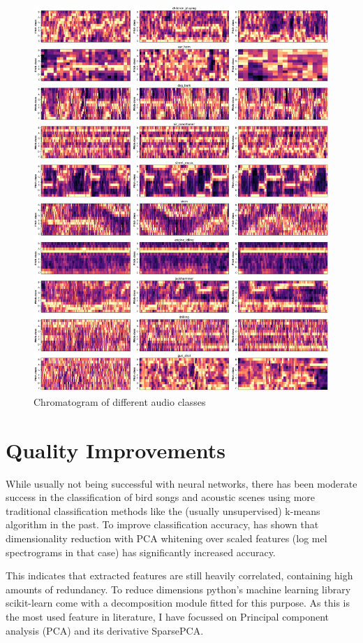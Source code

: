 \begin{figure}[H]
    \centering
	\includegraphics[width=.7\textwidth]{./images/features/chroma}
    \caption{Chromatogram of different audio classes}
    \label{fig:chroma}
\end{figure}



\section{Quality Improvements}
While usually not being successful with neural networks, there has been moderate success in the classification of bird songs and acoustic scenes using more traditional classification methods like the (usually unsupervised) k-means algorithm in the past. To improve classification accuracy, \cite{Coates2012} has shown that dimensionality reduction with PCA whitening over scaled features (log mel spectrograms in that case) has significantly increased accuracy. 

This indicates that extracted features are still heavily correlated, containing high amounts of redundancy. To reduce dimensions python's machine learning library scikit-learn come with a decomposition module fitted for this purpose. As this is the most used feature in literature, I have focussed on Principal component analysis (PCA) and its derivative SparsePCA.


